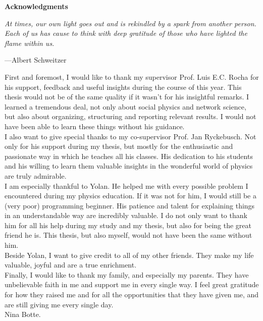 \documentclass[11 pt , letterpaper , twoside , openright]{book}
\newenvironment{abstract}%
{\cleardoublepage\null \vfill\begin{center}\bfseries \abstractname \end{center}}{\vfill\null}
\begin{document}
\pagestyle{plain}

\setcounter{abstractpage}{\value{page}}

\renewcommand{\abstractname}{Acknowledgments}
\begin{abstract}
\thispagestyle{plain}
\setcounter{page}{\value{abstractpage}}

\epigraph{\itshape At times, our own light goes out and is rekindled by a spark from another person. Each of us has cause to think with deep gratitude of those who have lighted the flame within us.}{---Albert Schweitzer}
\vspace*{\fill}
\noindent
First and foremost, I would like to thank my supervisor Prof. Luis E.C. Rocha for his support, feedback and useful insights during the course of this year. This thesis would not be of the same quality if it wasn't for his insightful remarks. I learned a tremendous deal, not only about social physics and network science, but also about organizing, structuring and reporting relevant results. I would not have been able to learn these things without his guidance.\\
\newline
I also want to give special thanks to my co-supervisor Prof. Jan Ryckebusch. Not only for his support during my thesis, but mostly for the enthusiastic and passionate way in which he teaches all his classes. His dedication to his students and his willing to learn them valuable insights in the wonderful world of physics are truly admirable.\\
\newline
I am especially thankful to Yolan. He helped me with every possible problem I encountered during my physics education. If it was not for him, I would still be a (very poor) programming beginner. His patience and talent for explaining things in an understandable way are incredibly valuable. I do not only want to thank him for all his help during my study and my thesis, but also for being the great friend he is. This thesis, but also myself, would not have been the same without him.\\
\newline
Beside Yolan, I want to give credit to all of my other friends. They make my life valuable, joyful and are a true enrichment.\\
\newline
Finally, I would like to thank my family, and especially my parents. They have unbelievable faith in me and support me in every single way. I feel great gratitude for how they raised me and for all the opportunities that they have given me, and are still giving me every single day.\\
\vfill
\noindent
Nina Botte.

\setcounter{abstractpage}{\value{page}}

\end{abstract}
\setcounter{page}{\value{abstractpage}}
\end{document}

